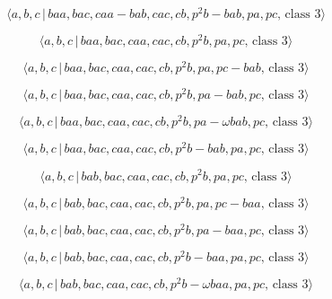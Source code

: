 \documentclass[10pt]{article}
\begin{document}
\begin{equation}
\langle a,b,c\,|\,baa,bac,caa-bab,cac,cb,p^2b-bab,pa,pc,\,\text{class }%
3\rangle  \tag{7.2770}
\end{equation}

\begin{equation}
\langle a,b,c\,|\,baa,bac,caa,cac,cb,p^2b,pa,pc,\,\text{class }3\rangle 
\tag{7.2771}
\end{equation}

\begin{equation}
\langle a,b,c\,|\,baa,bac,caa,cac,cb,p^2b,pa,pc-bab,\,\text{class }3\rangle 
\tag{7.2772}
\end{equation}

\begin{equation}
\langle a,b,c\,|\,baa,bac,caa,cac,cb,p^2b,pa-bab,pc,\,\text{class }3\rangle 
\tag{7.2773}
\end{equation}

\begin{equation}
\langle a,b,c\,|\,baa,bac,caa,cac,cb,p^{2}b,pa-\omega bab,pc,\,\text{class }%
3\rangle  \tag{7.2774}
\end{equation}

\begin{equation}
\langle a,b,c\,|\,baa,bac,caa,cac,cb,p^2b-bab,pa,pc,\,\text{class }3\rangle 
\tag{7.2775}
\end{equation}

\begin{equation}
\langle a,b,c\,|\,bab,bac,caa,cac,cb,p^2b,pa,pc,\,\text{class }3\rangle 
\tag{7.2776}
\end{equation}

\begin{equation}
\langle a,b,c\,|\,bab,bac,caa,cac,cb,p^2b,pa,pc-baa,\,\text{class }3\rangle 
\tag{7.2777}
\end{equation}

\begin{equation}
\langle a,b,c\,|\,bab,bac,caa,cac,cb,p^2b,pa-baa,pc,\,\text{class }3\rangle 
\tag{7.2778}
\end{equation}

\begin{equation}
\langle a,b,c\,|\,bab,bac,caa,cac,cb,p^2b-baa,pa,pc,\,\text{class }3\rangle 
\tag{7.2779}
\end{equation}

\begin{equation}
\langle a,b,c\,|\,bab,bac,caa,cac,cb,p^{2}b-\omega baa,pa,pc,\,\text{class }%
3\rangle  \tag{7.2780}
\end{equation}
\end{document}
